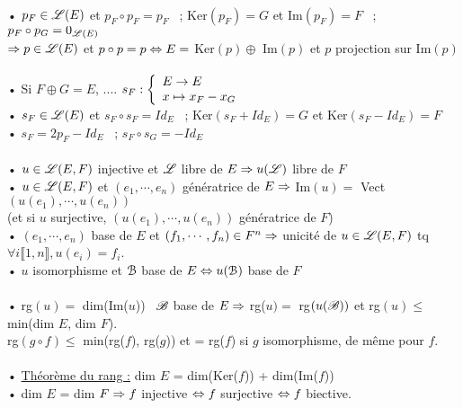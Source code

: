 \documentclass[12 pt]{exampleclass}
\begin{document}
\begin{flushleft}
\begin{doublespace}
	 \text{ }\\
	 • $p_F\in\mathscr{L}(E)$ et $p_F\circ p_F = p_F$ \ ; Ker$(p_F) = G$ et Im$(p_F) = F$ \ ; $p_F\circ p_G = 0_{\mathscr{L}(E)}$\\
	\qquad $\Rightarrow p\in \mathscr{L}(E)$ et $p\circ p = p \Leftrightarrow E =$ Ker$(p)\oplus$ Im$(p)$ et $p$ projection sur Im$(p)$\\
	\text{ }\\
	• Si $F\oplus G = E$, .... $s_F :  \left\{\begin{array}{ll} E \rightarrow E \\ x\mapsto x_F-x_G \end{array} \right.$\\
	\qquad • $s_F \in\mathscr{L}(E)$ et $s_F\circ s_F = Id_E$ \ ; Ker$(s_F + Id_E) = G$ et Ker$(s_F - Id_E) = F$\\
	• $s_F = 2 p_F - Id_E$ \ ; $s_F\circ s_G = - Id_E$\\
	\text{ }\\
	• $u\in\mathscr{L}(E,F)$ injective et $\mathscr{L}$ libre de $E \Rightarrow u(\mathscr{L})$ libre de $F$\\
	• $u\in\mathscr{L}(E,F)$ et $(e_1,\cdots , e_n)$ génératrice de $E \Rightarrow $ Im$(u) =$ Vect$(u(e_1),\cdots, u(e_n))$\\
	\quad (et si $u$ surjective, $(u(e_1),\cdots,u(e_n))$ génératrice de $F$)\\
	• $(e_1,\cdots,e_n)$ base de $E$ et $(f_1,\cdots,f_n)\in F^n \Rightarrow$ unicité de $u\in\mathscr{L}(E,F)$ tq $\forall i \llbracket 1,n\rrbracket , u(e_i) =f_i$.\\
	• $u$ isomorphisme et $\mathcal{B}$ base de $E \Leftrightarrow u(\mathcal{B})$ base de $F$\\
	
	\text{ }\\
	• rg$(u) =$ dim(Im($u$)) \ $\mathscr{B}$ base de $E \Rightarrow$ rg($u) = $ rg$(u(\mathscr{B}))$ et rg$(u) \leq$ min(dim $E$, dim $F$).\\
	rg$(g\circ f) \leq$ min(rg($f$), rg($g$)) et = rg($f$) si $g$ isomorphisme, de même pour $f$.\\
	
	\text{ }\\
	• \underline{Théorème du rang :} dim $E$ = dim(Ker($f$)) + dim(Im($f$))\\
	• dim $E$ = dim $F \Rightarrow f$ injective $\Leftrightarrow f$ surjective $\Leftrightarrow f$ biective.\\
	

\end{doublespace}
\end{flushleft}
\end{document}
